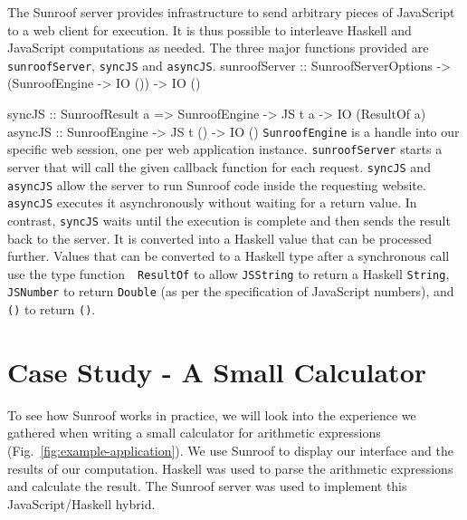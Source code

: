 \documentclass{llncs}
\newcommand{\Src}[1]{{\tt{#1}}}
\newenvironment{Code}{\verbatim}{\endverbatim}
\newcommand{\FigRef}[1]{Fig.~\ref{#1}}
\begin{document}
The Sunroof server provides infrastructure to send arbitrary pieces 
of JavaScript to a web client for execution. 
It is thus possible to interleave Haskell and JavaScript 
computations as needed. The three major functions
provided are \Src{sunroofServer}, \Src{syncJS} and \Src{asyncJS}.
\begin{Code}
sunroofServer :: SunroofServerOptions 
              -> (SunroofEngine -> IO ()) 
              -> IO ()

syncJS  :: SunroofResult a 
        => SunroofEngine -> JS t a -> IO (ResultOf a)
asyncJS :: SunroofEngine -> JS t () -> IO ()
\end{Code}
\Src{SunroofEngine} is a handle into our specific web session, one per web application instance.
\Src{sunroofServer} starts a server that will call the given callback function
for each request.
\Src{syncJS} and \Src{asyncJS} allow the server
to run Sunroof code inside the requesting website.
\Src{asyncJS} executes it asynchronously without 
waiting for a return value. In contrast, 
\Src{syncJS} waits until the execution is complete and
then sends the result back to the server. It
is converted into a Haskell value that can be processed further. 
Values that can be converted to a Haskell type after a synchronous
call use the type function~\cite{..}~\Src{ResultOf} to
allow \Src{JSString} to return a Haskell \Src{String}, 
\Src{JSNumber} to return \Src{Double} (as per the specification
of JavaScript numbers), and \Src{()} to return \Src{()}.

\section{Case Study - A Small Calculator}
\label{sec:extended-example}

To see how Sunroof works in practice, we will look into the 
experience we gathered when writing a small calculator
for arithmetic expressions (\FigRef{fig:example-application}). 
We use Sunroof to display our interface
and the results of our computation. Haskell was used to parse the 
arithmetic expressions and calculate the result. The Sunroof server 
was used to implement this JavaScript/Haskell hybrid.
\end{document}
